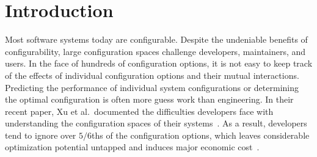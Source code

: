 \documentclass{sig-alternative}
\begin{document}

 
\section{Introduction}
 

Most software systems today are configurable. Despite the undeniable benefits
of configurability, large configuration spaces challenge developers, maintainers, and users. In the face of hundreds of configuration options, it is not easy to keep track of the effects of individual configuration options and their mutual interactions. Predicting the performance of individual system configurations or determining the optimal configuration is often more guess work than engineering. In their recent paper, Xu et al.\ documented the  difficulties developers face
with understanding  the configuration spaces of their systems~\cite{xu2015hey}. As a result, developers tend to ignore over $5/6$ths of the configuration options, which leaves considerable optimization potential untapped and induces major economic cost~\cite{xu2015hey}.
\end{document}
